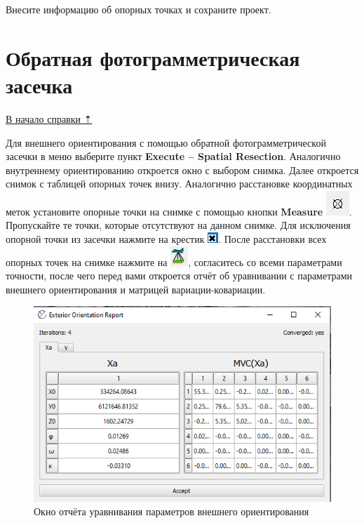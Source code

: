\documentclass[
  12pt,
]{book}
\begin{document}
Внесите информацию об опорных точках и сохраните проект.

\hypertarget{stereo-resection}{%
\section{Обратная фотограмметрическая засечка}\label{stereo-resection}}

\protect\hyperlink{stereo}{В начало справки ⇡}

Для внешнего ориентирования с помощью обратной фотограмметрической засечки в меню выберите пункт \textbf{Execute -- Spatial Resection}. Аналогично внутреннему ориентированию откроется окно с выбором снимка. Далее откроется снимок с таблицей опорных точек внизу. Аналогично расстановке координатных меток установите опорные точки на снимке с помощью кнопки \textbf{Measure} \includegraphics{images/Ref13/Measure.png}. Пропускайте те точки, которые отсутствуют на данном снимке. Для исключения опорной точки из засечки нажмите на крестик \includegraphics{images/Ref13/Exclusion.png}. После расстановки всех опорных точек на снимке нажмите на \includegraphics{images/Ref03/Execute_EO.png}, согласитесь со всеми параметрами точности, после чего перед вами откроется отчёт об уравнивании с параметрами внешнего ориентирования и матрицей вариации-ковариации.

\begin{figure}
\centering
\includegraphics{images/Ref13/EO_Report.png}
\caption{Окно отчёта уравнивания параметров внешнего ориентирования}
\end{figure}
\end{document}
